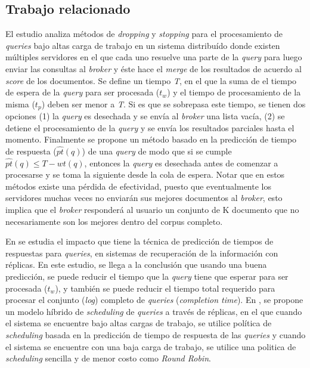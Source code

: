 \subsection{Trabajo relacionado}
\label{marco:tr}
El estudio \citep{Broccolo:2013} analiza métodos de \textit{dropping} y \textit{stopping} para el procesamiento de \textit{queries} bajo altas carga de trabajo en un sistema distribuído donde existen múltiples servidores en el que cada uno resuelve una parte de la \textit{query} para luego enviar las consultas al \textit{broker} y éste hace el \textit{merge} de los resultados de acuerdo al \textit{score} de los documentos. Se define un tiempo \textit{T}, en el que la suma de el tiempo de espera de la \textit{query} para ser procesada ($t_{w}$) y el tiempo de procesamiento de la misma ($t_{p}$) deben ser menor a \textit{T}. Si es que se sobrepasa este tiempo, se tienen dos opciones (1) la \textit{query} es desechada y se envía al \textit{broker} una lista vacía, (2) se detiene el procesamiento de la \textit{query} y se envía los resultados parciales hasta el momento. Finalmente se propone un método basado en la predicción de tiempo de respuesta ($\hat{pt}(q)$) de una \textit{query} \citep{Macdonald:2012} de modo que si se cumple $ \hat{pt}(q) \leq T - wt(q) $, entonces la \textit{query} es desechada antes de comenzar a procesarse y se toma la siguiente desde la cola de espera. Notar que en estos métodos existe una pérdida de efectividad, puesto que eventualmente los servidores muchas veces no enviarán sus mejores documentos al \textit{broker}, esto implica que el \textit{broker} responderá al usuario un conjunto de K documento que no necesariamente son los mejores dentro del corpus completo.

En \citep{Freire:2012} se estudia el impacto que tiene la técnica de predicción de tiempos de respuestas para \textit{queries}, \citep{Tonellotto:2011} en sistemas de recuperación de la información con réplicas. En este estudio, se llega a la conclusión que usando una buena predicción, se puede reducir el tiempo que la \textit{query} tiene que esperar para ser procesada ($t_{w}$), y también se puede reducir el tiempo total requerido para procesar el conjunto (\textit{log}) completo de \textit{queries} (\textit{completion time}). En \citep{Freire:2013}, se propone un modelo híbrido de \textit{scheduling} de \textit{queries} a través de réplicas, en el que cuando el sistema se encuentre bajo altas cargas de trabajo, se utilice política de \textit{scheduling} basada en la predicción de tiempo de respuesta de las \textit{queries} \citep{Macdonald:2012} y cuando el sistema se encuentre con una baja carga de trabajo, se utilice una politica de \textit{scheduling} sencilla y de menor costo como \textit{Round Robin}.